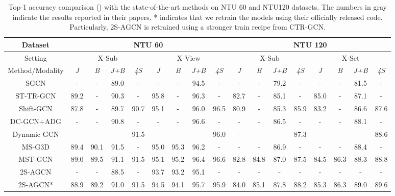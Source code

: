 \documentclass{article} \usepackage{iclr2023_conference,times}
\begin{document}
\begin{table}[t]
    \scriptsize
    \setlength\tabcolsep{2.5pt}
    \caption{Top-1 accuracy comparison () with the state-of-the-art methods on NTU 60 and NTU120 datasets. The numbers in gray indicate the results reported in their papers. * indicates that we retrain the models using their officially released code. Particularly, 2S-AGCN is retrained using a stronger train recipe from CTR-GCN.}
    \begin{tabular}{c||c|c|c|c|c|c|c|c||c|c|c|c|c|c|c|c}
\rowcolor{gray!30} Dataset & \multicolumn{8}{c||}{NTU 60} & \multicolumn{8}{c}{NTU 120} \\\hline
       \rowcolor{gray!30} Setting & \multicolumn{4}{c|}{X-Sub} & \multicolumn{4}{c||}{X-View} & \multicolumn{4}{c|}{X-Sub} & \multicolumn{4}{c}{X-Set} \\\hline
       \rowcolor{gray!30} Method/Modality & \textit{J} & \textit{B} & \textit{J+B} & \textit{4S} & \textit{J} & \textit{B} & \textit{J+B} & \textit{4S} & \textit{J} & \textit{B} & \textit{J+B} & \textit{4S} & \textit{J} & \textit{B} & \textit{J+B} & \textit{4S} \\
       \hline \hline
       SGCN \citep{SGN} & - & - & 89.0 & - & - & - & 94.5 & - & - & - & 79.2 & - & - & - & 81.5 & - \\
       ST-TR-GCN \citep{sttragcn} & 89.2 & - & 90.3 & - & 95.8 & - & 96.3 & - & 82.7 & - & 85.1 & - & 85.0 & - & 87.1 & - \\
       Shift-GCN \citep{shiftgcn} & 87.8 & - & 89.7 & 90.7 & 95.1 & - & 96.0 & 96.5 & 80.9 & - & 85.3 & 85.9 & 83.2 & - & 86.6 & 87.6 \\
       DC-GCN+ADG \citep{decouplinggcn} & - & - & 90.8 & - & - & - & 96.6 & - & - & - & 86.5 & - & - & - & 88.1 & - \\
       Dynamic GCN \citep{DynamicGCN} & - & - & - & 91.5 & - & - & - & 96.0 & - & - & - & 87.3 & - & - & - & 88.6 \\
       MS-G3D \citep{MSG3D} & 89.4 & 90.1 & 91.5 & - & 95.0 & 95.3 & 96.2 & - & - & - & 86.9 & - & - & - & 88.4 & - \\ 
       MST-GCN \citep{MSGCN} & 89.0 & 89.5 & 91.1 & 91.5 & 95.1 & 95.2 & 96.4 & 96.6 & 82.8 & 84.8 & 87.0 & 87.5 & 84.5 & 86.3 & 88.3 & 88.8 \\\hline \hline
       {\color{gray}2S-AGCN \citep{2SAGCN}} & - & - & {\color{gray}88.5} & - & {\color{gray}93.7} & {\color{gray}93.2} & {\color{gray}95.1} & - & - & - & - & - & - & - & - & - \\
       2S-AGCN* \citep{2SAGCN} & 88.9 & 89.2 & 91.0 & 91.5 & 94.5 & 94.1 & 95.7 & 95.9 & 84.0 & 85.1 & 87.8 & 88.2 & 85.3 & 86.3 & 89.0 & 89.6 \\

\end{tabular}
\end{table}
\end{document}
